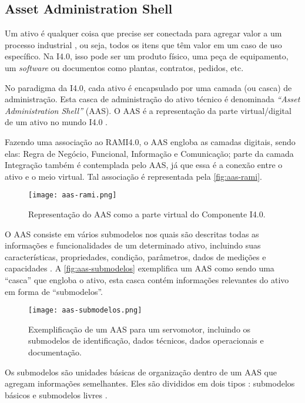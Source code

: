 \subsection{Asset Administration Shell}

Um ativo é qualquer coisa que precise ser conectada para agregar valor a um processo industrial \cite{bader2019aas}, ou seja, todos os itens que têm valor em um caso de uso específico. Na I4.0, isso pode ser um produto físico, uma peça de equipamento, um \textit{software} ou documentos como plantas, contratos, pedidos, etc.

No paradigma da I4.0, cada ativo é encapsulado por uma camada (ou casca) de administração. Esta casca de administração do ativo técnico é denominada \textit{``Asset Administration Shell''} (AAS). O AAS é a representação da parte virtual/digital de um ativo no mundo I4.0 \cite{ye2019aas}.

Fazendo uma associação ao RAMI4.0, o AAS engloba as camadas digitais, sendo elas: Regra de Negócio, Funcional, Informação e Comunicação; parte da camada Integração também é contemplada pelo AAS, já que essa é a conexão entre o ativo e o meio virtual. Tal associação é representada pela \autoref{fig:aas-rami}.

\begin{figure}[htb]
	\centering
	\texttt{[image: aas-rami.png]}
	\caption{Representação do AAS como a parte virtual do Componente I4.0.}
	\label{fig:aas-rami}
\end{figure}

O AAS consiste em vários submodelos nos quais são descritas todas as informações e funcionalidades de um determinado ativo, incluindo suas características, propriedades, condição, parâmetros, dados de medições e capacidades \cite{bader2019aas}. A \autoref{fig:aas-submodelos} exemplifica um AAS como sendo uma ``casca'' que engloba o ativo, esta casca contém informações relevantes do ativo em forma de ``submodelos''.

\begin{figure}[htb]
	\centering
	\texttt{[image: aas-submodelos.png]}
	\caption{Exemplificação de um AAS para um servomotor, incluindo os submodelos de identificação, dados técnicos, dados operacionais e documentação.}
	\label{fig:aas-submodelos}
\end{figure}

Os submodelos são unidades básicas de organização dentro de um AAS que agregam informações semelhantes. Eles são divididos em dois tipos \cite{plattform2019detailsaas}: submodelos básicos e submodelos livres \cite{bader2019aas}.


